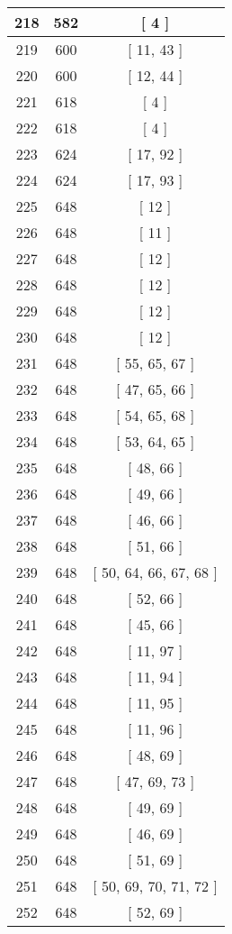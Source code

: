 \begin{center}
\begin{longtable}[H]{|| c c c ||}
\hline
218 & 582 & [ 4 ] \\ 
\hline
219 & 600 & [ 11, 43 ] \\ 
\hline
220 & 600 & [ 12, 44 ] \\ 
\hline
221 & 618 & [ 4 ] \\ 
\hline
222 & 618 & [ 4 ] \\ 
\hline
223 & 624 & [ 17, 92 ] \\ 
\hline
224 & 624 & [ 17, 93 ] \\ 
\hline
225 & 648 & [ 12 ] \\ 
\hline
226 & 648 & [ 11 ] \\ 
\hline
227 & 648 & [ 12 ] \\ 
\hline
228 & 648 & [ 12 ] \\ 
\hline
229 & 648 & [ 12 ] \\ 
\hline
230 & 648 & [ 12 ] \\ 
\hline
231 & 648 & [ 55, 65, 67 ] \\ 
\hline
232 & 648 & [ 47, 65, 66 ] \\ 
\hline
233 & 648 & [ 54, 65, 68 ] \\ 
\hline
234 & 648 & [ 53, 64, 65 ] \\ 
\hline
235 & 648 & [ 48, 66 ] \\ 
\hline
236 & 648 & [ 49, 66 ] \\ 
\hline
237 & 648 & [ 46, 66 ] \\ 
\hline
238 & 648 & [ 51, 66 ] \\ 
\hline
239 & 648 & [ 50, 64, 66, 67, 68 ] \\ 
\hline
240 & 648 & [ 52, 66 ] \\ 
\hline
241 & 648 & [ 45, 66 ] \\ 
\hline
242 & 648 & [ 11, 97 ] \\ 
\hline
243 & 648 & [ 11, 94 ] \\ 
\hline
244 & 648 & [ 11, 95 ] \\ 
\hline
245 & 648 & [ 11, 96 ] \\ 
\hline
246 & 648 & [ 48, 69 ] \\ 
\hline
247 & 648 & [ 47, 69, 73 ] \\ 
\hline
248 & 648 & [ 49, 69 ] \\ 
\hline
249 & 648 & [ 46, 69 ] \\ 
\hline
250 & 648 & [ 51, 69 ] \\ 
\hline
251 & 648 & [ 50, 69, 70, 71, 72 ] \\ 
\hline
252 & 648 & [ 52, 69 ] \\ 
\hline

\end{longtable}
\end{center}
